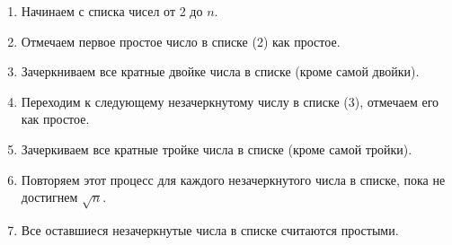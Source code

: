 \documentclass[12pt, a4paper, openany]{book}
\begin{document}
\begin{enumerate}
    \item Начинаем с списка чисел от 2 до $n$.
    \item Отмечаем первое простое число в списке (2) как простое.
    \item Зачеркниваем все кратные двойке числа в списке (кроме самой двойки).
    \item Переходим к следующему незачеркнутому числу в списке (3), отмечаем его как простое.
    \item Зачеркиваем все кратные тройке числа в списке (кроме самой тройки).
    \item Повторяем этот процесс для каждого незачеркнутого числа в списке, пока не достигнем $\sqrt{n}$.
    \item Все оставшиеся незачеркнутые числа в списке считаются простыми.
\end{enumerate}
\end{document}
